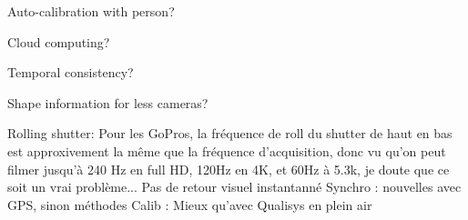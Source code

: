 Auto-calibration with person?

Cloud computing?

Temporal consistency?

Shape information for less cameras?

Rolling shutter: Pour les GoPros, la fréquence de roll du shutter de haut en bas est approxivement la même que la fréquence d'acquisition, donc vu qu'on peut filmer jusqu'à 240 Hz en full HD, 120Hz en 4K, et 60Hz à 5.3k, je doute que ce soit un vrai problème...
Pas de retour visuel instantanné
Synchro : nouvelles avec GPS, sinon méthodes
Calib : Mieux qu'avec Qualisys en plein air

